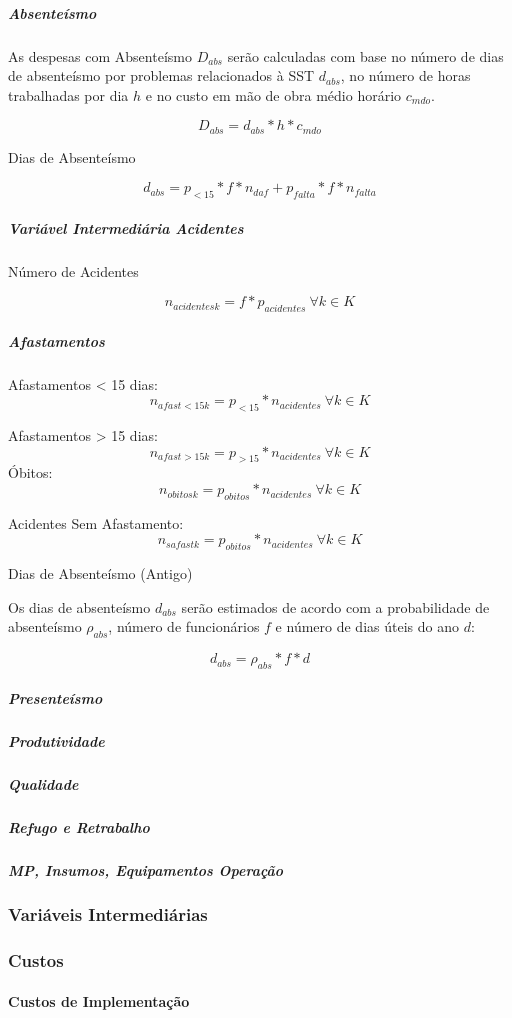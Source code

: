 \documentclass[]{article}
\let\oldparagraph\paragraph
\renewcommand{\paragraph}[1]{\oldparagraph{#1}\mbox{}}
\let\oldsubparagraph\subparagraph
\renewcommand{\subparagraph}[1]{\oldsubparagraph{#1}\mbox{}}
\begin{document}
\subparagraph{Absenteísmo}\label{absenteismo}

As despesas com Absenteísmo \(D_{abs}\) serão calculadas com base no
número de dias de absenteísmo por problemas relacionados à SST
\(d_{abs}\), no número de horas trabalhadas por dia \(h\) e no custo em
mão de obra médio horário \(c_{mdo}\).

\[D_{abs} = d_{abs} * h * c_{mdo}\]

Dias de Absenteísmo

\[ d_{abs} = p_{<15}*f*n_{daf}+p_{falta}*f*n_{falta}\]

\subparagraph{Variável Intermediária
Acidentes}\label{variavel-intermediaria-acidentes}

Número de Acidentes

\[n_{acidentesk} = f * p_{acidentes} \ \forall k \in K\]

\subparagraph{Afastamentos}\label{afastamentos}

Afastamentos \textless{} 15 dias:
\[n_{afast<15k} = p_{<15} * n_{acidentes}  \ \forall k \in K\]

Afastamentos \textgreater{} 15 dias:
\[n_{afast>15k} = p_{>15} * n_{acidentes}  \ \forall k \in K\] Óbitos:
\[n_{obitosk} = p_{obitos} *n_{acidentes}  \ \forall k \in K \]

Acidentes Sem Afastamento:
\[n_{safastk} = p_{obitos} *n_{acidentes}  \ \forall k \in K \]

Dias de Absenteísmo (Antigo)

Os dias de absenteísmo \(d_{abs}\) serão estimados de acordo com a
probabilidade de absenteísmo \(\rho_{abs}\), número de funcionários
\(f\) e número de dias úteis do ano \(d\):

\[d_{abs} = \rho_{abs} * f * d\]

\subparagraph{Presenteísmo}\label{presenteismo}

\subparagraph{Produtividade}\label{produtividade}

\subparagraph{Qualidade}\label{qualidade}

\subparagraph{Refugo e Retrabalho}\label{refugo-e-retrabalho}

\subparagraph{MP, Insumos, Equipamentos
Operação}\label{mp-insumos-equipamentos-operacao}

\subsubsection{Variáveis Intermediárias}\label{variaveis-intermediarias}

\subsubsection{Custos}\label{custos}

\paragraph{Custos de Implementação}\label{custos-de-implementacao}
\end{document}
